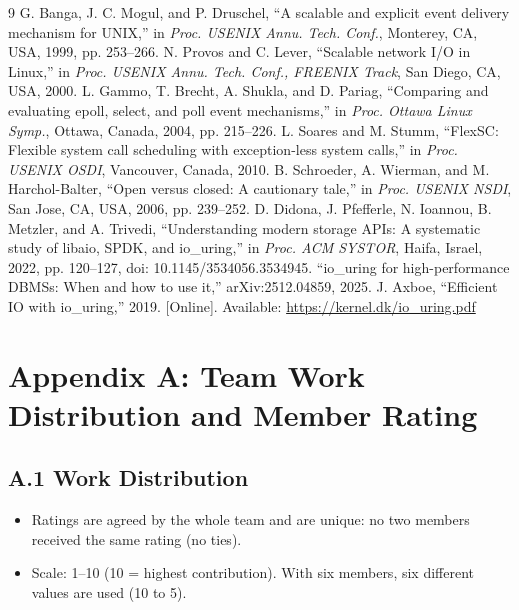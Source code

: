 \documentclass[conference,10pt]{IEEEtran}
\renewcommand{\arraystretch}{1.08}
\begin{document}
\begin{thebibliography}{9}
 G. Banga, J. C. Mogul, and P. Druschel, ``A scalable and explicit event delivery mechanism for UNIX,'' in \emph{Proc. USENIX Annu. Tech. Conf.}, Monterey, CA, USA, 1999, pp. 253--266.
 N. Provos and C. Lever, ``Scalable network I/O in Linux,'' in \emph{Proc. USENIX Annu. Tech. Conf., FREENIX Track}, San Diego, CA, USA, 2000.
 L. Gammo, T. Brecht, A. Shukla, and D. Pariag, ``Comparing and evaluating epoll, select, and poll event mechanisms,'' in \emph{Proc. Ottawa Linux Symp.}, Ottawa, Canada, 2004, pp. 215--226.
 L. Soares and M. Stumm, ``FlexSC: Flexible system call scheduling with exception-less system calls,'' in \emph{Proc. USENIX OSDI}, Vancouver, Canada, 2010.
 B. Schroeder, A. Wierman, and M. Harchol-Balter, ``Open versus closed: A cautionary tale,'' in \emph{Proc. USENIX NSDI}, San Jose, CA, USA, 2006, pp. 239--252.
 D. Didona, J. Pfefferle, N. Ioannou, B. Metzler, and A. Trivedi, ``Understanding modern storage APIs: A systematic study of libaio, SPDK, and io\_uring,'' in \emph{Proc. ACM SYSTOR}, Haifa, Israel, 2022, pp. 120--127, doi: 10.1145/3534056.3534945.
 ``io\_uring for high-performance DBMSs: When and how to use it,'' arXiv:2512.04859, 2025.
 J. Axboe, ``Efficient IO with io\_uring,'' 2019. [Online]. Available: \url{https://kernel.dk/io_uring.pdf}
\end{thebibliography}

\clearpage
\onecolumn
\appendices
\renewcommand{\arraystretch}{1.35}
\newcommand{\hdr}{\rowcolor[gray]{0.86}}

\section*{Appendix A: Team Work Distribution and Member Rating}
\subsection*{A.1 Work Distribution}
\begin{itemize}
\item Ratings are agreed by the whole team and are unique: no two members received the same rating (no ties).
\item Scale: 1--10 (10 = highest contribution). With six members, six different values are used (10 to 5).
\end{itemize}
\end{document}
